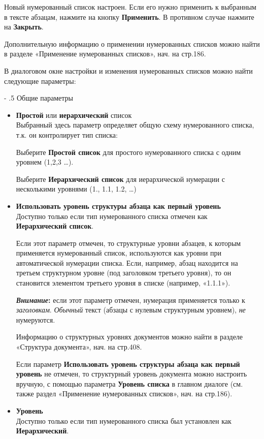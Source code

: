 \documentclass[a4paper,10pt]{article}
\makeatletter
\renewcommand\paragraph{%
   \@startsection{paragraph}{4}{0mm}%
      {-\baselineskip}%
      {.5\baselineskip}%
      {\normalfont\normalsize\bfseries}}
\makeatother
\begin{document}
Новый нумерованный список настроен. Если его нужно применить к выбранным в тексте абзацам, нажмите на кнопку \textbf{Применить}. В противном случае нажмите на \textbf{Закрыть}.

Дополнительную информацию о применении нумерованных списков можно найти в разделе «Применение нумерованных списков», нач. на стр.186.

В диалоговом окне настройки и изменения нумерованных списков можно найти следующие параметры:

\paragraph{Общие параметры}

\begin{itemize}
 \item \textbf{Простой} или \textbf{иерархический} список\\
 Выбранный здесь параметр определяет общую схему нумерованного списка, т.к. он контролирует тип списка:
 
 Выберите \textbf{Простой список} для простого нумерованного списка с одним уровнем (1,2,3 …).
 
 Выберите \textbf{Иерархический список} для иерархической нумерации с несколькими уровнями (1., 1.1, 1.2, …)
 \item \textbf{Использовать уровень структуры абзаца как первый уровень}\\
 Доступно только если тип нумерованного списка отмечен как \textbf{Иерархический список}.
 
 Если этот параметр отмечен, то структурные уровни абзацев, к которым применяется нумерованный список, используются как уровни при автоматической нумерации списка. Если, например, абзац находится на третьем структурном уровне (под заголовком третьего уровня), то он становится элементом третьего уровня в списке (например, «1.1.1»).
 
 \begin{mdframed}[backgroundcolor=blue!10]
\textbf{\textit{Внимание}:} если этот параметр отмечен, нумерация применяется только к \textit{заголовкам}. \textit{Обычный} текст (абзацы с нулевым структурным уровнем), \textit{не} нумеруются.
\end{mdframed}

Информацию о структурных уровнях документов можно найти в разделе «Структура документа», нач. на стр.408.

Если параметр \textbf{Использовать уровень структуры абзаца как первый уровень} не отмечен, то структурный уровень документа можно настроить вручную, с помощью параметра \textbf{Уровень списка} в главном диалоге (см. также раздел «Применение нумерованных списков», нач. на стр.186).
\item \textbf{Уровень}\\
Доступно только если тип нумерованного списка был установлен как \textbf{Иерархический}.


\end{itemize}
\end{document}
